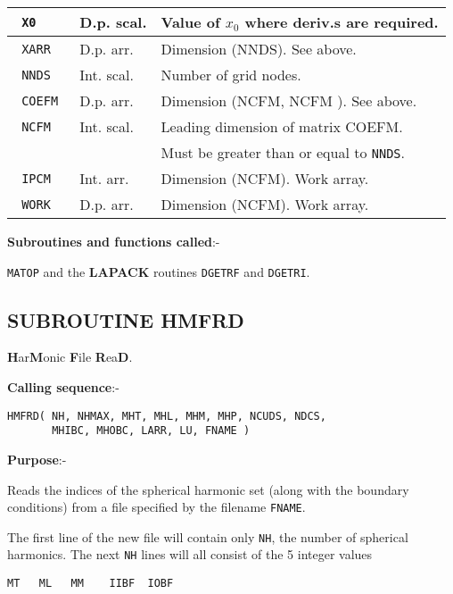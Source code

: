 \begin{tabular}{|l|l|l|}
\hline
\verb+ X0  + & D.p. scal. & Value of $x_0$ where deriv.s are
                            required. \\
\hline
\verb+ XARR  + & D.p. arr. & Dimension (NNDS). See above. \\
\hline
\verb+ NNDS + & Int. scal. & Number of grid nodes. \\
\hline
\verb+ COEFM + & D.p. arr. & Dimension (NCFM, NCFM ). See above. \\
\hline
\verb+ NCFM  + & Int. scal. & Leading dimension of matrix COEFM. \\
& & Must be greater than or equal to \verb+NNDS+. \\
\hline
\verb+ IPCM + & Int. arr. & Dimension (NCFM). Work array. \\
\hline
\verb+ WORK + & D.p. arr. & Dimension (NCFM). Work array. \\
\hline
\end{tabular} \newline

{\bf Subroutines and functions called}:- \newline

\verb+MATOP+ and the {\bf LAPACK} routines
\verb+DGETRF+ and \verb+DGETRI+.

\subsection{SUBROUTINE HMFRD}
\label{sec:hmfrdinfo}

{\bf H}ar{\bf M}onic
{\bf F}ile
{\bf R}ea{\bf D}. \newline

{\bf Calling sequence}:-
\begin{verbatim}
HMFRD( NH, NHMAX, MHT, MHL, MHM, MHP, NCUDS, NDCS,
       MHIBC, MHOBC, LARR, LU, FNAME )
\end{verbatim}

{\bf Purpose}:- \newline

Reads the indices of the spherical harmonic set (along
with the boundary conditions) from a file specified by the
filename \verb+FNAME+.

The first line of the new file will contain only \verb+NH+,
the number of spherical harmonics.
The next \verb+NH+ lines will all consist of the 5 integer
values
\begin{verbatim}
MT   ML   MM    IIBF  IOBF
\end{verbatim}

